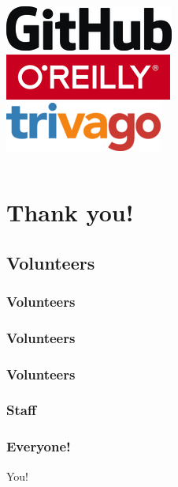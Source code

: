 \documentclass[aspectratio=169]{beamer}
\begin{document}
\begin{frame}
\begin{columns}[t]
		\vspace{0.5cm}
		\includegraphics[scale=0.5]{images/github.png}\\
		\vspace{0.5cm}
		\includegraphics[scale=0.4]{images/oreilly.png}\\
		\vspace{0.5cm}
		\includegraphics[scale=0.4]{images/trivago.png}
	\end{columns}
\end{frame}

\section{Thank you!}

\subsection{Volunteers}

\begin{frame}
	\frametitle{Volunteers}
\end{frame}

\begin{frame}
	\frametitle{Volunteers}
\end{frame}

\begin{frame}
	\frametitle{Volunteers}
\end{frame}

\begin{frame}
	\frametitle{Staff}
	\vfill
	\vfill
\end{frame}

\begin{frame}
	\frametitle{Everyone!}
	\vfill
	\begin{center}
	{\Huge You!}
	\end{center}
	\vfill
\end{frame}
\end{document}

